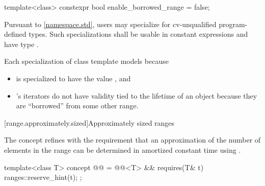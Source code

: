 %
\begin{itemdecl}
template<class>
  constexpr bool enable_borrowed_range = false;
\end{itemdecl}

\begin{itemdescr}
\pnum
\remarks
Pursuant to \ref{namespace.std}, users may specialize 
for cv-unqualified program-defined types.
Such specializations shall be
usable in constant expressions and
have type .

\pnum
\begin{example}
Each specialization  of class template 
models  because
\begin{itemize}
\item
{} is specialized
to have the value , and

\item
{}'s iterators
do not have validity tied to the lifetime of an  object
because they are ``borrowed'' from some other range.
\end{itemize}
\end{example}
\end{itemdescr}

[range.approximately.sized]{Approximately sized ranges}

\pnum
The  concept refines 
with the requirement that
an approximation of the number of elements in the range
can be determined in amortized constant time using .

\begin{itemdecl}
template<class T>
  concept @@ =
    @@<T> && requires(T& t) { ranges::reserve_hint(t); };
\end{itemdecl}

